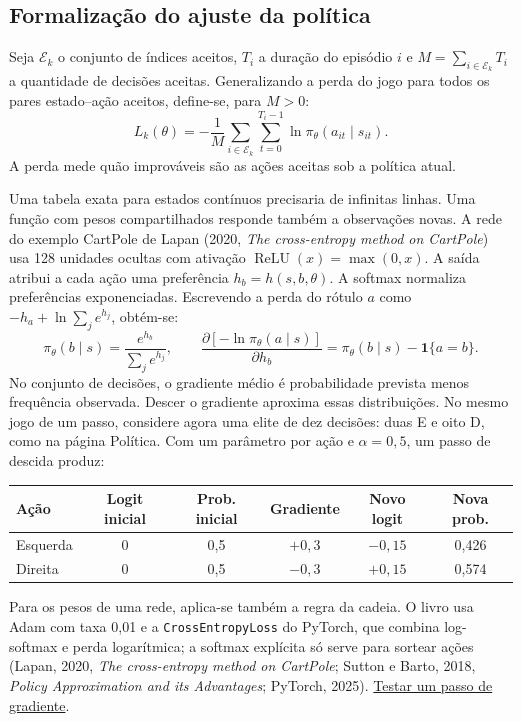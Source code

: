 \documentclass[12pt]{article}
\begin{document}
\subsection{Formalização do ajuste da política}

Seja $\mathcal E_k$ o conjunto de índices aceitos, $T_i$ a duração do episódio $i$ e $M=\sum_{i\in\mathcal E_k}T_i$ a quantidade de decisões aceitas. Generalizando a perda do jogo para todos os pares estado--ação aceitos, define-se, para $M>0$:
\[
 L_k(\theta)=-\frac1M\sum_{i\in\mathcal E_k}\sum_{t=0}^{T_i-1}
       \ln\pi_\theta(a_{it}\mid s_{it}).
\]
A perda mede quão improváveis são as ações aceitas sob a política atual.

Uma tabela exata para estados contínuos precisaria de infinitas linhas. Uma função com pesos compartilhados responde também a observações novas. A rede do exemplo CartPole de Lapan (2020, \emph{The cross-entropy method on CartPole}) usa 128 unidades ocultas com ativação $\operatorname{ReLU}(x)=\max(0,x)$. A saída atribui a cada ação uma preferência $h_b=h(s,b,\theta)$. A softmax normaliza preferências exponenciadas. Escrevendo a perda do rótulo $a$ como $-h_a+\ln\sum_j e^{h_j}$, obtém-se:
\[
 \pi_\theta(b\mid s)=\frac{e^{h_b}}{\sum_j e^{h_j}},\qquad
 \frac{\partial[-\ln\pi_\theta(a\mid s)]}{\partial h_b}
 =\pi_\theta(b\mid s)-\mathbf 1\{a=b\}.
\]
No conjunto de decisões, o gradiente médio é probabilidade prevista menos frequência observada. Descer o gradiente aproxima essas distribuições. No mesmo jogo de um passo, considere agora uma elite de dez decisões: duas E e oito D, como na página Política. Com um parâmetro por ação e $\alpha=0{,}5$, um passo de descida produz:
\begin{center}
\begin{tabular}{lccccc}
\toprule
Ação & Logit inicial & Prob. inicial & Gradiente & Novo logit & Nova prob.\\
\midrule
Esquerda & 0 & 0,5 & $+0{,}3$ & $-0{,}15$ & 0,426\\
Direita  & 0 & 0,5 & $-0{,}3$ & $+0{,}15$ & 0,574\\
\bottomrule
\end{tabular}
\end{center}
Para os pesos de uma rede, aplica-se também a regra da cadeia. O livro usa Adam com taxa 0,01 e a \texttt{CrossEntropyLoss} do PyTorch, que combina log-softmax e perda logarítmica; a softmax explícita só serve para sortear ações (Lapan, 2020, \emph{The cross-entropy method on CartPole}; Sutton e Barto, 2018, \emph{Policy Approximation and its Advantages}; PyTorch, 2025). \href{https://metodo-da-entropia-cruzada.vercel.app/politica.html}{Testar um passo de gradiente}.
\end{document}

